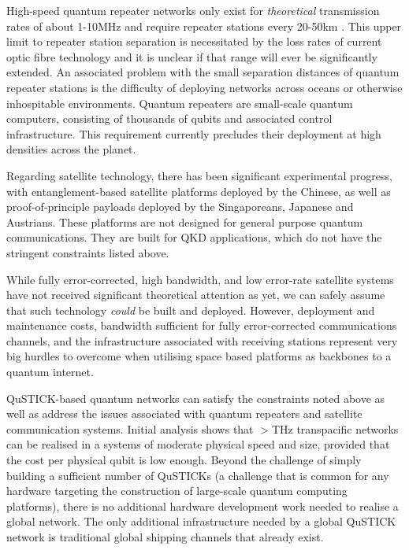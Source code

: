 \documentclass[twocolumn, aps, rmp, amsmath, amssymb, nofootinbib, superscriptaddress, longbibliography, floatfix, table-of-contents, eqsecnum]{revtex4-2}
\begin{document}
High-speed quantum repeater networks only exist for \textit{theoretical} transmission rates of about 1-10MHz \cite{SD-Fowler:2010aa} and require repeater stations every 20-50km \cite{SD-Munro:2012aa}. This upper limit to repeater station separation is necessitated by the loss rates of current optic fibre technology and it is unclear if that range will ever be significantly extended. An associated problem with the small separation distances of quantum repeater stations is the difficulty of deploying networks across oceans or otherwise inhospitable environments. Quantum repeaters are small-scale quantum computers, consisting of thousands of qubits and associated control infrastructure. This requirement currently precludes their deployment at high densities across the planet. 

Regarding satellite technology, there has been significant experimental progress, with entanglement-based satellite platforms deployed by the Chinese, as well as proof-of-principle payloads deployed by the Singaporeans, Japanese and Austrians. These platforms are not designed for general purpose quantum communications. They are built for QKD applications, which do not have the stringent constraints listed above. 

While fully error-corrected, high bandwidth, and low error-rate satellite systems have not received significant theoretical attention as yet, we can safely assume that such technology \textit{could} be built and deployed. However, deployment and maintenance costs, bandwidth sufficient for fully error-corrected communications channels, and the infrastructure associated with receiving stations represent very big hurdles to overcome when utilising space based platforms as backbones to a quantum internet. 

QuSTICK-based quantum networks can satisfy the constraints noted above as well as address the issues associated with quantum repeaters and satellite communication systems. Initial analysis shows that $>$THz transpacific networks can be realised in a systems of moderate physical speed and size, provided that the cost per physical qubit is low enough. Beyond the challenge of simply building a sufficient number of QuSTICKs (a challenge that is common for any hardware targeting the construction of large-scale quantum computing platforms), there is no additional hardware development work needed to realise a global network. The only additional infrastructure needed by a global QuSTICK network is traditional global shipping channels that already exist. 
\end{document}
